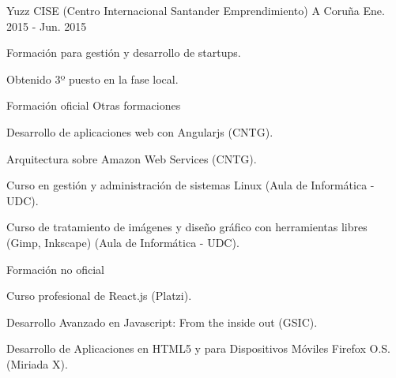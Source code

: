 \begin{cventries}


\cventry
{Yuzz} %
{CISE (Centro Internacional Santander Emprendimiento)} %
{A Coruña} %
{Ene. 2015 - Jun. 2015} %
{ %
\begin{cvitems}
\item {Formación para gestión y desarrollo de startups.}
\item {Obtenido 3º puesto en la fase local.}
\end{cvitems}
}


\cventry
{Formación oficial} %
{Otras formaciones} %
{} %
{} %
{ %
\begin{cvitems}
\item {Desarrollo de aplicaciones web con Angularjs (CNTG).}
\item {Arquitectura sobre Amazon Web Services (CNTG).}
\item {Curso en gestión y administración de sistemas Linux (Aula de Informática - UDC).}
\item {Curso de tratamiento de imágenes y diseño gráfico con herramientas libres (Gimp, Inkscape) (Aula de Informática - UDC).}
\end{cvitems}
}


\cventry
{Formación no oficial} %
{} %
{} %
{} %
{ %
\begin{cvitems}
\item {Curso profesional de React.js (Platzi).}
\item {Desarrollo Avanzado en Javascript: From the inside out (GSIC).}
\item {Desarrollo de Aplicaciones en HTML5 y para Dispositivos Móviles Firefox O.S. (Miriada X).}
\end{cvitems}
}

\end{cventries}